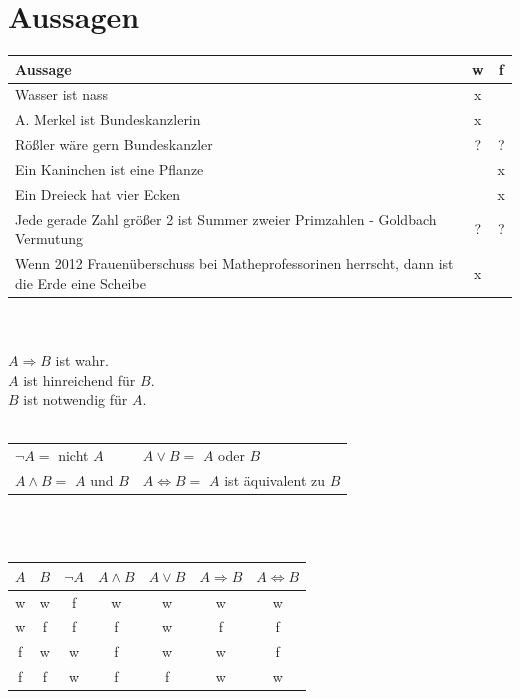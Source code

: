 \section{Aussagen}
\begin{center}
\begin{tabular}{l|c|c}
Aussage & w & f\\ \hline
Wasser ist nass & x & \\
A. Merkel ist Bundeskanzlerin & x & \\
Rößler wäre gern Bundeskanzler & ? & ?\\
Ein Kaninchen ist eine Pflanze & & x\\
Ein Dreieck hat vier Ecken & & x\\
Jede gerade Zahl größer 2 ist Summer zweier Primzahlen - Goldbach Vermutung & ? & ? \\
Wenn 2012 Frauenüberschuss bei Matheprofessorinen herrscht, dann ist die Erde eine Scheibe & x &\\
\end{tabular}

\quad\\
\quad\\

$ A \Rightarrow B$ ist wahr. \\
$A$ ist hinreichend für $B$. \\
$B$ ist notwendig für $A$. \\

\quad\\

\begin{tabular}{ll}
	$\neg A=$ nicht $A$ & $A \vee B =$ $A$ oder $B$\\
	$A \wedge B =$ $A$ und $B$ & $A \Leftrightarrow B =$ $A$ ist äquivalent zu $B$\\
\end{tabular}

\quad\\
\quad\\

\begin{tabular}{cc||ccccc}
$A$ & $B$ & $\neg A$ & $A \wedge B$ & $A \vee B$ & $A \Rightarrow B$ & $A \Leftrightarrow B$\\ \hline
w & w & f & w & w & w & w \\
w & f & f & f &w & f & f \\
f & w & w & f & w & w & f \\
f & f & w & f & f & w & w\\
\end{tabular}
\end{center}
%
%
%

